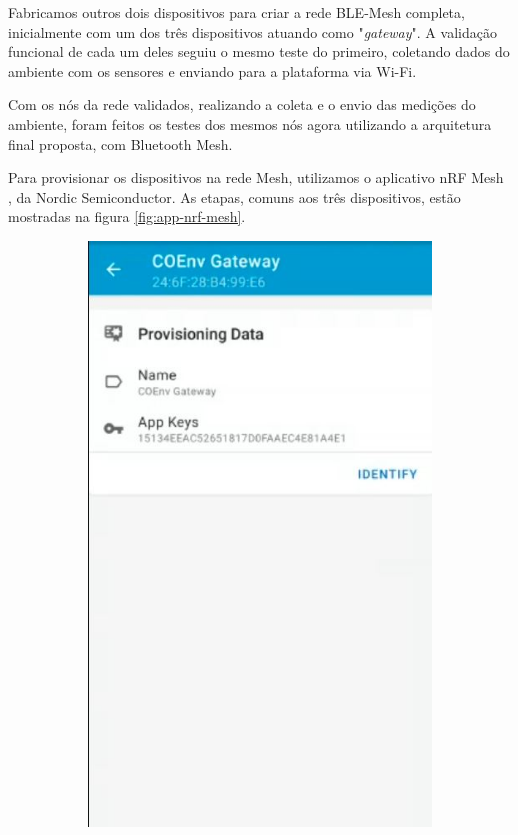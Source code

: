 \documentclass[../monografia.tex]{subfiles}
\begin{document}
Fabricamos outros dois dispositivos para criar a rede BLE-Mesh completa, inicialmente com um dos três dispositivos atuando como "\textit{gateway}". A validação funcional de cada um deles seguiu o mesmo teste do primeiro, coletando dados do ambiente com os sensores e enviando para a plataforma via Wi-Fi. 

Com os nós da rede validados, realizando a coleta e o envio das medições do ambiente, foram feitos os testes dos mesmos nós agora utilizando a arquitetura final proposta, com Bluetooth Mesh. 

Para provisionar os dispositivos na rede Mesh, utilizamos o aplicativo nRF Mesh \cite{nrf-app}, da Nordic Semiconductor. As etapas, comuns aos três dispositivos, estão mostradas na figura \ref{fig:app-nrf-mesh}.

\begin{figure}[h]
	\centering
	\begin{subfigure}[b]{0.22\textwidth}
		\centering
		\includegraphics[width=\textwidth]{mesh-bind-1}

\end{subfigure}
\end{figure}
\end{document}
